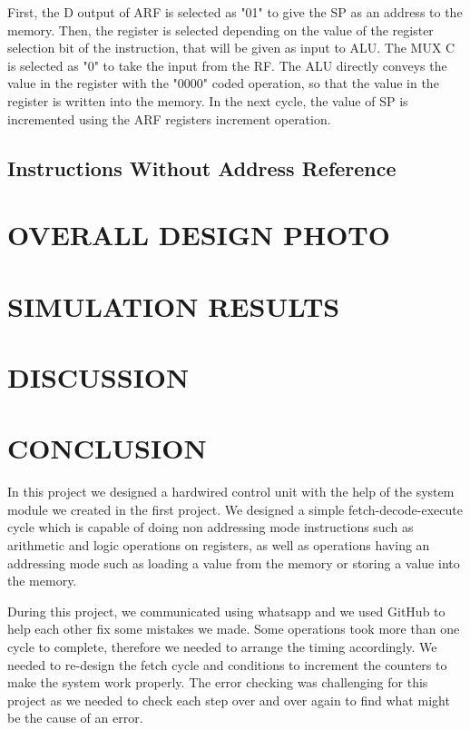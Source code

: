 \documentclass[pdftex,12pt,a4paper]{article}
\begin{document}
First, the D output of ARF is selected as "01" to give the SP as an address to the memory. Then, the register is 
selected depending on the value of the register selection bit of the instruction, that will be given as input to ALU.
The MUX C is selected as "0" to take the input from the RF. The ALU directly conveys the value in the register with 
the "0000" coded operation, so that the value in the register is written into the memory. In the next cycle, the value 
of SP is incremented using the ARF registers increment operation.


\subsection{Instructions Without Address Reference}






\section{OVERALL DESIGN PHOTO}








\section{SIMULATION RESULTS}




\section{DISCUSSION}






\section{CONCLUSION}
In this project we designed a hardwired control unit with the help of the system module we created in the
first project. We designed a simple fetch-decode-execute cycle which is capable of doing non addressing
mode instructions such as arithmetic and logic operations on registers, as well as operations having an
addressing mode such as loading a value from the memory or storing a value into the memory.

During this project, we communicated using whatsapp and we used GitHub to help each other fix some 
mistakes we made. Some operations took more than one cycle to complete, therefore we needed to arrange 
the timing accordingly. We needed to re-design the fetch cycle and conditions to increment the counters 
to make the system work properly. The error checking was challenging for this project as we needed to 
check each step over and over again to find what might be the cause of an error. 
\end{document}
